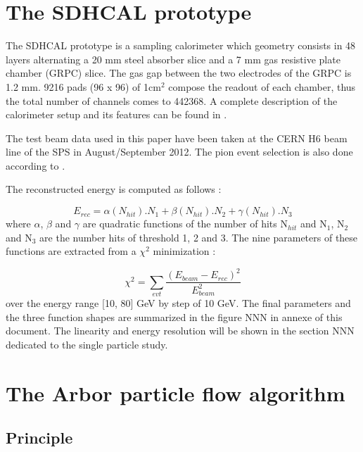 \documentclass[cits]{JINST}
\begin{document}
\section{The SDHCAL prototype}

The SDHCAL prototype is a sampling calorimeter which geometry consists in 48 layers alternating a 20 mm steel absorber slice and a 7 mm gas resistive plate chamber (GRPC) slice. The gas gap between the two electrodes of the GRPC is 1.2 mm. 9216 pads (96 x 96) of 1cm$^2$ compose the readout of each chamber, thus the total number of channels  comes to 442368. A complete description of the calorimeter setup and its features can be found in \cite{sdhcal-paper}. 

The test beam data used in this paper have been taken at the CERN H6 beam line of the SPS in August/September 2012. The pion event selection is also done according to \cite{sdhcal-paper}.

The reconstructed energy is computed as follows :

\begin{equation}
  E_{rec} = \alpha(N_{hit}).N_{1}
          + \beta(N_{hit}) .N_{2}
          + \gamma(N_{hit}).N_{3}   
\end{equation}
where $\alpha$, $\beta$ and $\gamma$ are quadratic functions of the number of hits N$_{hit}$ and N$_1$, N$_2$ and N$_3$ are the number hits of threshold 1, 2 and 3. The nine parameters of these functions are extracted from a $\chi^2$ minimization :

\begin{equation}
  \chi^2 = \sum\limits_{evt} \frac{(E_{beam} - E_{rec})^2}{E_{beam}^2}
\end{equation}
over the energy range [10, 80] GeV by step of 10 GeV. The final parameters and the three function shapes are summarized in the figure NNN in annexe of this document. The linearity and energy resolution will be shown in the section NNN dedicated to the single particle study.

\section{The Arbor particle flow algorithm}

\subsection{Principle} 
\end{document}
